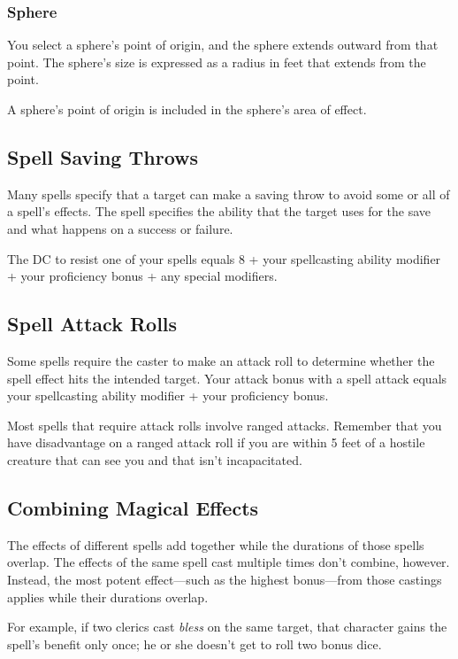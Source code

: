 \subsubsection{Sphere}

You select a sphere's point of origin, and the sphere extends outward from that point. The sphere's size is expressed as a radius in feet that extends from the point.

A sphere's point of origin is included in the sphere's area of effect.

\subsection{Spell Saving Throws}

Many spells specify that a target can make a saving throw to avoid some or all of a spell's effects. The spell specifies the ability that the target uses for the save and what happens on a success or failure.

The DC to resist one of your spells equals 8 + your spellcasting ability modifier + your proficiency bonus + any special modifiers.

\subsection{Spell Attack Rolls}

Some spells require the caster to make an attack roll to determine whether the spell effect hits the intended target. Your attack bonus with a spell attack equals your spellcasting ability modifier + your proficiency bonus.

Most spells that require attack rolls involve ranged attacks. Remember that you have disadvantage on a ranged attack roll if you are within 5 feet of a hostile creature that can see you and that isn't incapacitated.

\subsection{Combining Magical Effects}

The effects of different spells add together while the durations of those spells overlap. The effects of the same spell cast multiple times don't combine, however. Instead, the most potent effect—such as the highest bonus—from those castings applies while their durations overlap.

For example, if two clerics cast \textit{bless} on the same target, that character gains the spell's benefit only once; he or she doesn't get to roll two bonus dice.

